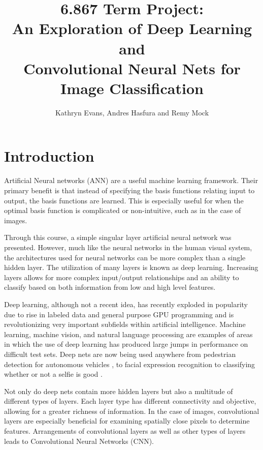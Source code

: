 \documentclass[12pt, twocolumn]{article}
\begin{document}
\title{ 6.867 Term Project: \\ An Exploration of Deep Learning and \\ Convolutional Neural Nets for Image Classification\\ }
 \author{Kathryn Evans, Andres Hasfura and Remy Mock}
\maketitle

\section{ Introduction} 
Artificial Neural networks (ANN) are a useful machine learning framework. Their primary benefit is that instead of specifying the basis functions relating input to output, the basis functions are learned.  This is especially useful for when the optimal basis function is complicated or non-intuitive, such as in the case of images.


Through this course, a simple singular layer artificial neural network was presented. However, much like the neural networks in the human visual system, the architectures used for neural networks can be more complex than a single hidden layer. The utilization of many layers is known as deep learning.  Increasing layers allows for more complex input/output relationships and an ability to classify based on both information from low and high level features.

Deep learning, although not a recent idea, has recently exploded in popularity due to rise in labeled data and general purpose GPU programming and is revolutionizing very important subfields within artificial intelligence. Machine learning, machine vision, and natural language processing are examples of areas in which the use of deep learning has produced large jumps in performance on difficult test sets. Deep nets are now being used anywhere from pedestrian detection for autonomous vehicles \cite{Szarvas2006}, to facial expression recognition \cite{Li2015} to classifying whether or not a selfie is good \cite{Karpathy}. 
	
Not only do deep nets contain more hidden layers but also a multitude of different types of layers. Each layer type has different connectivity and objective, allowing for a greater richness of information. In the case of images, convolutional layers are especially beneficial for examining spatially close pixels to determine features. Arrangements of convolutional layers as well as other types of layers leads to Convolutional Neural Networks (CNN). 
\end{document}
